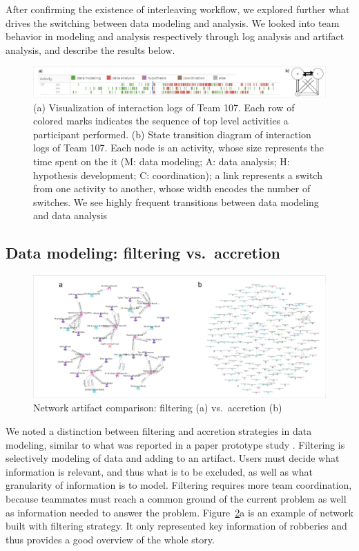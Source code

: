 After confirming the existence of interleaving workflow, we explored further what drives the switching between data modeling and analysis. We looked into team behavior in modeling and analysis respectively through log analysis and artifact analysis, and describe the results below.

\begin{figure}
\centering
\includegraphics[width=6.5in]{./img/intertwined.jpg}
\caption{(a) Visualization of interaction logs of Team 107. Each row of
colored marks indicates the sequence of top level activities a
participant performed. (b) State transition diagram of interaction logs of Team 107. Each node is an activity, whose size represents the time spent on the it (M: data modeling; A: data analysis; H: hypothesis development; C: coordination); a
link represents a switch from one activity to another, whose width
encodes the number of switches. We see highly frequent transitions between data modeling and data analysis \label{fig:interleaving}}
\end{figure}


\subsection{Data modeling: filtering vs.~accretion}\label{data-modeling-accretion-vs.filtering}

\begin{figure}
\centering
\includegraphics[width=\columnwidth]{./img/network_accretion_filter.png}
\caption{Network artifact comparison: filtering (a)
vs.~accretion (b) \label{fig:network_accretion}}
\end{figure}

We noted a distinction between filtering and accretion
strategies in data modeling, similar to what was reported in a paper prototype study \cite{Carroll2013}. Filtering is selectively modeling of data
and adding to an artifact. Users must decide what information is
relevant, and thus what is to be excluded, as well as what granularity
of information is to model. Filtering requires more team coordination,
because teammates must reach a common ground of the current problem as
well as information needed to answer the problem. Figure~\ref{fig:network_accretion}a is an example of network built with filtering strategy. It only represented key information of robberies and thus provides a good overview of the whole story.

